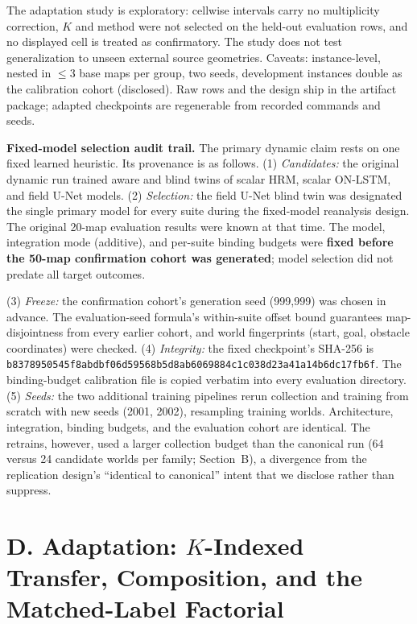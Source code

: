 \documentclass[letterpaper]{article} %
\begin{document}
The adaptation study is exploratory: cellwise intervals carry no multiplicity correction, $K$ and method were not selected on the held-out evaluation rows, and no displayed cell is treated as confirmatory. The study does not test generalization to unseen external source geometries. Caveats: instance-level, nested in $\leq$3 base maps per group, two seeds, development instances double as the calibration cohort (disclosed). Raw rows and the design ship in the artifact package; adapted checkpoints are regenerable from recorded commands and seeds.

\textbf{Fixed-model selection audit trail.} The primary dynamic claim rests on one fixed learned heuristic. Its provenance is as follows. (1) \emph{Candidates:} the original dynamic run trained aware and blind twins of scalar HRM, scalar ON-LSTM, and field U-Net models. (2) \emph{Selection:} the field U-Net blind twin was designated the single primary model for every suite during the fixed-model reanalysis design. The original 20-map evaluation results were known at that time. The model, integration mode (additive), and per-suite binding budgets were \textbf{fixed before the 50-map confirmation cohort was generated}; model selection did not predate all target outcomes.

(3) \emph{Freeze:} the confirmation cohort's generation seed (999{,}999) was chosen in advance. The evaluation-seed formula's within-suite offset bound guarantees map-disjointness from every earlier cohort, and world fingerprints (start, goal, obstacle coordinates) were checked. (4) \emph{Integrity:} the fixed checkpoint's SHA-256 is \texttt{b8378950545f8abd\allowbreak bf06d59568b5d8ab\allowbreak 6069884c1c038d23\allowbreak a41a14b6dc17fb6f}. The binding-budget calibration file is copied verbatim into every evaluation directory. (5) \emph{Seeds:} the two additional training pipelines rerun collection and training from scratch with new seeds (2001, 2002), resampling training worlds. Architecture, integration, binding budgets, and the evaluation cohort are identical. The retrains, however, used a larger collection budget than the canonical run (64 versus 24 candidate worlds per family; Section~B), a divergence from the replication design's ``identical to canonical'' intent that we disclose rather than suppress.

\clearpage
\section{D. Adaptation: $K$-Indexed Transfer, Composition, and the Matched-Label Factorial}
\end{document}
